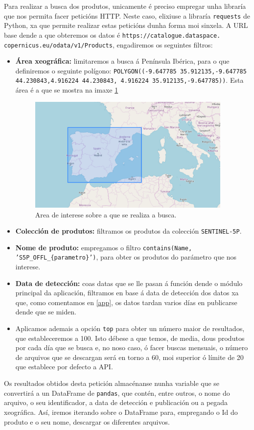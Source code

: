 Para realizar a busca dos produtos, unicamente é preciso empregar unha libraría que nos permita facer peticións HTTP. Neste caso, elixiuse a libraría \texttt{requests} de Python, xa que permite
realizar estas peticións dunha forma moi sinxela. A URL base dende a que obteremos os datos é \texttt{https://catalogue.dataspace. copernicus.eu/odata/v1/Products}, engadiremos os seguintes filtros:
\begin{itemize}
    \item \textbf{Área xeográfica:} limitaremos a busca á Península Ibérica, para o que definiremos o seguinte polígono: \texttt{POLYGON((-9.647785 35.912135,-9.647785 44.230843,4.916224 44.230843,
        4.916224 35.912135,-9.647785))}.
    Esta área é a que se mostra na imaxe \ref{fig:areainterese}
    \begin{figure}
        \centerline{\includegraphics[width=10cm]{figuras/area.png}}
        \caption{Area de interese sobre a que se realiza a busca.}
        \label{fig:areainterese}
    \end{figure}
    \item \textbf{Colección de produtos:} filtramos os produtos da colección \texttt{SENTINEL-5P}.
    \item \textbf{Nome de produto:} empregamos o filtro \texttt{contains(Name, 'S5P\_OFFL\_\{parametro\}')}, para obter os produtos do parámetro que nos interese.
    \item \textbf{Data de detección:} coas datas que se lle pasan á función dende o módulo principal da aplicación, filtramos en base á data de detección dos datos xa que, como comentamos en \ref{app}, os
    datos tardan varios días en publicarse dende que se miden.
    \item Aplicamos ademais a opción \texttt{top} para obter un número maior de resultados, que estableceremos a 100. Isto débese a que temos, de media, dous produtos por cada día que se busca e,
    no noso caso, ó facer buscas mensuais, o número de arquivos que se descargan será en torno a 60, moi superior ó límite de 20 que establece por defecto a API.
\end{itemize}
Os resultados obtidos desta petición almacénanse nunha variable que se convertirá a un DataFrame de \texttt{pandas}, que contén, entre outros, o nome do arquivo, o seu identificador, a data de
detección e publicación ou a pegada xeográfica. Así, iremos iterando sobre o DataFrame para, empregando o Id do produto e o seu nome, descargar os diferentes arquivos.

